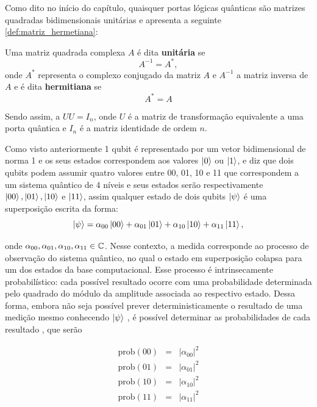     
Como dito no início do capítulo, quaisquer portas lógicas quânticas são matrizes quadradas bidimensionais unitárias e \textcite[pag. 425]{Anton2012} apresenta a seguinte \autoref{def:matriz_hermetiana}:

    \begin{defi}
        \label{def:matriz_hermetiana}
        Uma matriz quadrada complexa $A$ é dita \textbf{unitária} se $$A^{-1}=A^*,$$ onde $A^*$ representa o complexo conjugado da matriz $A$ e $A^{-1}$ a matriz inversa de $A$ e é dita \textbf{hermitiana} se $$A^*=A$$
    \end{defi}
    
Sendo assim, a $UU=I_n$, onde $U$ é a matriz de transformação equivalente a uma porta quântica e $I_n$ é a matriz identidade de ordem $n$.

Como visto anteriormente 1 qubit é representado por um vetor bidimensional de norma 1 e os seus estados correspondem aos valores $\ket{0}$ ou $\ket{1}$, e \textcite{Amaral2011MecanicaFormacao} diz que dois qubits podem assumir quatro valores entre 00, 01, 10 e 11 que correspondem a um sistema quântico de 4 níveis e seus estados serão respectivamente $\ket{00}, \ket{01}, \ket{10}$ e $\ket{11}$, assim qualquer estado de dois qubits $\ket{\psi}$ é uma superposição escrita da forma:
    $$
        \ket{\psi}=\alpha_{00}\ket{00}+\alpha_{01}\ket{01}+\alpha_{10}\ket{10}+\alpha_{11}\ket{11},
    $$

\noindent onde $\alpha_{00}, \alpha_{01}, \alpha_{10}, \alpha_{11}\in\operatorname{\mathbb{C}}$.  Nesse contexto, a medida corresponde ao processo de observação do sistema quântico, no qual o estado em superposição colapsa para um dos estados da base computacional. Esse processo é intrinsecamente probabilístico: cada possível resultado ocorre com uma probabilidade determinada pelo quadrado do módulo da amplitude associada ao respectivo estado. Dessa forma, embora não seja possível prever deterministicamente o resultado de uma medição mesmo conhecendo $\ket{\psi}$ , é possível determinar as probabilidades de cada resultado \cite{griffiths2018introduction, Marquezino2019}, que serão

    $$
        \begin{array}{lcl}
             \text{prob}(00) & = &|\alpha_{00}|^2 \\
             \text{prob}(01) & = &|\alpha_{01}|^2 \\
             \text{prob}(10) & = &|\alpha_{10}|^2 \\
             \text{prob}(11) & = &|\alpha_{11}|^2 \\
        \end{array} 
    $$

